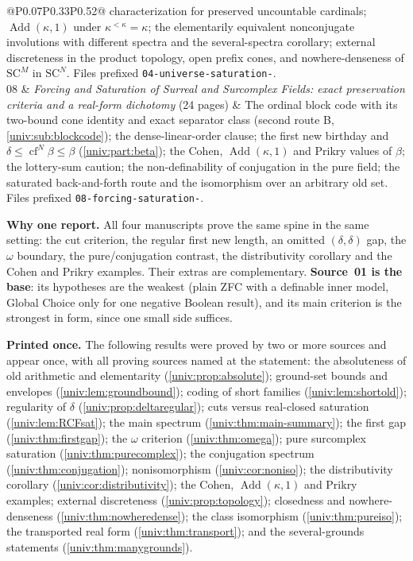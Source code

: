 \documentclass[11pt,letterpaper]{article}
\numberwithin{equation}{section}
\theoremstyle{definition}
\theoremstyle{remark}
\newcommand{\SC}{\mathrm{SC}}
\newcommand{\SCM}{\SC^{M}}
\newcommand{\SCN}{\SC^{N}}
\newcommand{\cf}{\operatorname{cf}}
\newcommand{\Add}{\operatorname{Add}}
\begin{document}
{\begin{longtable}{@{}P{0.07\textwidth}P{0.33\textwidth}P{0.52\textwidth}@{}}
characterization for preserved uncountable cardinals; $\Add(\kappa,1)$ under
$\kappa^{<\kappa}=\kappa$; the elementarily equivalent nonconjugate
involutions with different spectra and the several-spectra corollary;
external discreteness in the product topology, open prefix cones, and
nowhere-denseness of $\SCM$ in $\SCN$. Files prefixed
\texttt{04-universe-saturation-}.\\
08 & \emph{Forcing and Saturation of Surreal and Surcomplex Fields: exact
preservation criteria and a real-form dichotomy} (24 pages) & The ordinal
block code with its two-bound cone identity and exact separator class (second
route B, \cref{univ:sub:blockcode}); the dense-linear-order clause; the first
new birthday and $\delta\le\cf^N\beta\le\beta$ (\cref{univ:part:beta}); the
Cohen, $\Add(\kappa,1)$ and Prikry values of $\beta$; the lottery-sum caution;
the non-definability of conjugation in the pure field; the saturated
back-and-forth route and the isomorphism over an arbitrary old set. Files
prefixed \texttt{08-forcing-saturation-}.\\
\bottomrule
\end{longtable}}

\textbf{Why one report.} All four manuscripts prove the same spine in the same
setting: the cut criterion, the regular first new length, an omitted
$(\delta,\delta)$ gap, the $\omega$ boundary, the pure/conjugation contrast,
the distributivity corollary and the Cohen and Prikry examples. Their extras
are complementary. \textbf{Source~01 is the base}: its hypotheses are the
weakest (plain ZFC with a definable inner model, Global Choice only for one
negative Boolean result), and its main criterion is the strongest in form,
since one small side suffices.

\textbf{Printed once.} The following results were proved by two or more
sources and appear once, with all proving sources named at the statement:
the absoluteness of old arithmetic and elementarity
(\cref{univ:prop:absolute}); ground-set bounds and envelopes
(\cref{univ:lem:groundbound}); coding of short families
(\cref{univ:lem:shortold}); regularity of $\delta$
(\cref{univ:prop:deltaregular}); cuts versus real-closed saturation
(\cref{univ:lem:RCFsat}); the main spectrum
(\cref{univ:thm:main-summary}); the first gap (\cref{univ:thm:firstgap}); the
$\omega$ criterion (\cref{univ:thm:omega}); pure surcomplex saturation
(\cref{univ:thm:purecomplex}); the conjugation spectrum
(\cref{univ:thm:conjugation}); nonisomorphism (\cref{univ:cor:noniso}); the
distributivity corollary (\cref{univ:cor:distributivity}); the Cohen,
$\Add(\kappa,1)$ and Prikry examples; external discreteness
(\cref{univ:prop:topology}); closedness and nowhere-denseness
(\cref{univ:thm:nowheredense}); the class isomorphism
(\cref{univ:thm:pureiso}); the transported real form
(\cref{univ:thm:transport}); and the several-grounds statements
(\cref{univ:thm:manygrounds}).
\end{document}
